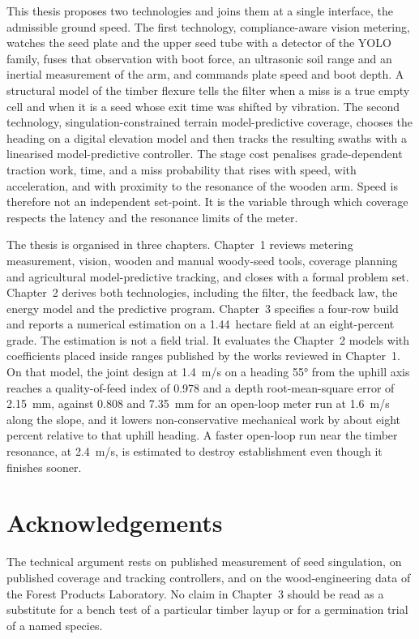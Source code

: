 \documentclass[12pt,a4paper]{report}
\begin{document}
This thesis proposes two technologies and joins them at a single interface, the admissible ground speed. The first technology, compliance-aware vision metering, watches the seed plate and the upper seed tube with a detector of the YOLO family, fuses that observation with boot force, an ultrasonic soil range and an inertial measurement of the arm, and commands plate speed and boot depth. A structural model of the timber flexure tells the filter when a miss is a true empty cell and when it is a seed whose exit time was shifted by vibration. The second technology, singulation-constrained terrain model-predictive coverage, chooses the heading on a digital elevation model and then tracks the resulting swaths with a linearised model-predictive controller. The stage cost penalises grade-dependent traction work, time, and a miss probability that rises with speed, with acceleration, and with proximity to the resonance of the wooden arm. Speed is therefore not an independent set-point. It is the variable through which coverage respects the latency and the resonance limits of the meter.

The thesis is organised in three chapters. Chapter~1 reviews metering measurement, vision, wooden and manual woody-seed tools, coverage planning and agricultural model-predictive tracking, and closes with a formal problem set. Chapter~2 derives both technologies, including the filter, the feedback law, the energy model and the predictive program. Chapter~3 specifies a four-row build and reports a numerical estimation on a \num{1.44}~hectare field at an eight-percent grade. The estimation is not a field trial. It evaluates the Chapter~2 models with coefficients placed inside ranges published by the works reviewed in Chapter~1. On that model, the joint design at \SI{1.4}{m/s} on a heading \ang{55} from the uphill axis reaches a quality-of-feed index of \num{0.978} and a depth root-mean-square error of \SI{2.15}{mm}, against \num{0.808} and \SI{7.35}{mm} for an open-loop meter run at \SI{1.6}{m/s} along the slope, and it lowers non-conservative mechanical work by about eight percent relative to that uphill heading. A faster open-loop run near the timber resonance, at \SI{2.4}{m/s}, is estimated to destroy establishment even though it finishes sooner.

\chapter*{Acknowledgements}
The technical argument rests on published measurement of seed singulation, on published coverage and tracking controllers, and on the wood-engineering data of the Forest Products Laboratory. No claim in Chapter~3 should be read as a substitute for a bench test of a particular timber layup or for a germination trial of a named species.
\end{document}
